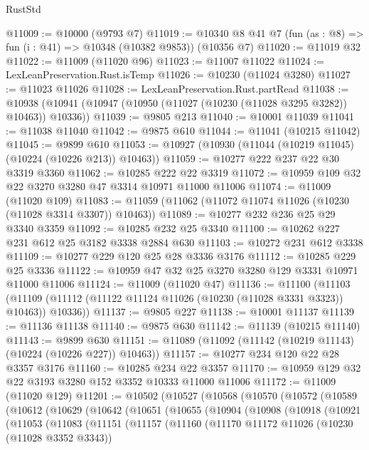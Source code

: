 \begin{lexlean}{RustStd}
\begin{coremodule}
@11009 := @10000 (@9793 @7)
@11019 := @10340 @8 @41 @7 (fun (as : @8) => fun (i : @41) => @10348 (@10382 @9853)) (@10356 @7)
@11020 := @11019 @32
@11022 := @11009 (@11020 @96)
@11023 := @11007 @11022
@11024 := LexLeanPreservation.Rust.isTemp
@11026 := @10230 (@11024 @3280)
@11027 := @11023 @11026
@11028 := LexLeanPreservation.Rust.partRead
@11038 := @10938 (@10941 (@10947 (@10950 (@11027 (@10230 (@11028 @3295 @3282)) @10463)) @10336))
@11039 := @9805 @213
@11040 := @10001 @11039
@11041 := @11038 @11040
@11042 := @9875 @610
@11044 := @11041 (@10215 @11042)
@11045 := @9899 @610
@11053 := @10927 (@10930 (@11044 (@10219 @11045) (@10224 (@10226 @213)) @10463))
@11059 := @10277 @222 @237 @22 @30 @3319 @3360
@11062 := @10285 @222 @22 @3319
@11072 := @10959 @109 @32 @22 @3270 @3280 @47 @3314 @10971 @11000 @11006
@11074 := @11009 (@11020 @109)
@11083 := @11059 (@11062 (@11072 @11074 @11026 (@10230 (@11028 @3314 @3307)) @10463))
@11089 := @10277 @232 @236 @25 @29 @3340 @3359
@11092 := @10285 @232 @25 @3340
@11100 := @10262 @227 @231 @612 @25 @3182 @3338 @2884 @630
@11103 := @10272 @231 @612 @3338
@11109 := @10277 @229 @120 @25 @28 @3336 @3176
@11112 := @10285 @229 @25 @3336
@11122 := @10959 @47 @32 @25 @3270 @3280 @129 @3331 @10971 @11000 @11006
@11124 := @11009 (@11020 @47)
@11136 := @11100
    (@11103 (@11109 (@11112 (@11122 @11124 @11026 (@10230 (@11028 @3331 @3323)) @10463)) @10336))
@11137 := @9805 @227
@11138 := @10001 @11137
@11139 := @11136 @11138
@11140 := @9875 @630
@11142 := @11139 (@10215 @11140)
@11143 := @9899 @630
@11151 := @11089 (@11092 (@11142 (@10219 @11143) (@10224 (@10226 @227)) @10463))
@11157 := @10277 @234 @120 @22 @28 @3357 @3176
@11160 := @10285 @234 @22 @3357
@11170 := @10959 @129 @32 @22 @3193 @3280 @152 @3352 @10333 @11000 @11006
@11172 := @11009 (@11020 @129)
@11201 := @10502
    (@10527
      (@10568
        (@10570
          (@10572
            (@10589
              (@10612
                (@10629
                  (@10642
                    (@10651
                      (@10655
                        (@10904
                          (@10908
                            (@10918
                              (@10921
                                (@11053
                                  (@11083
                                    (@11151
                                      (@11157
                                        (@11160
                                          (@11170
                                            @11172
                                            @11026
                                            (@10230 (@11028 @3352 @3343))

\end{coremodule}
\end{lexlean}
